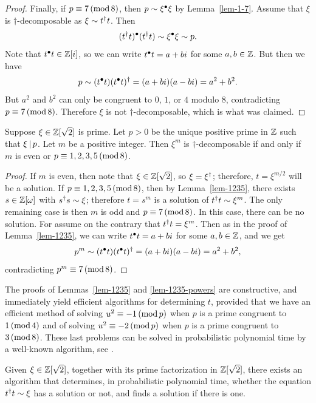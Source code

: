 \begin{proof}
  Finally, if $p\equiv 7\,(\mathop{{\rm mod}}8)$, then $p\sim\xi^{\bullet}\xi$ by
  Lemma~\ref{lem-1-7}. Assume that $\xi$ is $\dagger$-decomposable as
  $\xi\sim t^{\dagger} t$. Then
  \[ (t^{\dagger} t)^{\bullet}(t^{\dagger} t) \sim \xi^{\bullet}\xi\sim p.
  \]
  Note that $t^{\bullet} t\in\mathbb{Z}[i]$, so we can write $t^{\bullet} t=a+bi$ for some
  $a,b\in\mathbb{Z}$. But then we have
  \[ p \sim (t^{\bullet} t)(t^{\bullet} t)^{\dagger} = (a+bi)(a-bi) = a^2+b^2.
  \]
  But $a^2$ and $b^2$ can only be congruent to $0$, $1$, or $4$ modulo
  8, contradicting $p\equiv 7\,(\mathop{{\rm mod}}8)$. Therefore $\xi$ is not
  $\dagger$-decomposable, which is what was claimed.
\end{proof}

\begin{lemma}\label{lem-1235-powers}
  Suppose $\xi\in\mathbb{Z}[\sqrt2]$ is prime. Let $p>0$ be the unique
  positive prime in $\mathbb{Z}$ such that $\xi\mathop{|}\nolimits p$. Let $m$ be a
  positive integer. Then $\xi^m$ is $\dagger$-decomposable if and only
  if $m$ is even or $p\equiv 1,2,3,5\,(\mathop{{\rm mod}}8)$.
\end{lemma}

\begin{proof}
  If $m$ is even, then note that $\xi\in\mathbb{Z}[\sqrt2]$, so $\xi=\xi^{\dagger}$;
  therefore, $t=\xi^{m/2}$ will be a solution. If $p\equiv
  1,2,3,5\,(\mathop{{\rm mod}}8)$, then by Lemma~\ref{lem-1235}, there exists
  $s\in\mathbb{Z}[\omega]$ with $s^{\dagger} s\sim\xi$; therefore $t=s^m$ is a
  solution of $t^{\dagger} t\sim\xi^m$. The only remaining case is then $m$
  is odd and $p\equiv 7\,(\mathop{{\rm mod}}8)$. In this case, there can be no
  solution. For assume on the contrary that $t^{\dagger} t=\xi^m$. Then as in
  the proof of Lemma~\ref{lem-1235}, we can write $t^{\bullet} t=a+bi$ for
  some $a,b\in\mathbb{Z}$, and we get
  \[ p^m \sim (t^{\bullet} t)(t^{\bullet} t)^{\dagger} = (a+bi)(a-bi) = a^2+b^2,
  \]
  contradicting $p^m\equiv 7\,(\mathop{{\rm mod}}8)$.
\end{proof}

\begin{remark}\label{rem-1235-eff}
  The proofs of Lemmas~\ref{lem-1235} and {\ref{lem-1235-powers}} are
  constructive, and immediately yield efficient algorithms for
  determining $t$, provided that we have an efficient method of
  solving $u^2\equiv-1\,(\mathop{{\rm mod}} p)$ when $p$ is a prime congruent to
  $1\,(\mathop{{\rm mod}}4)$ and of solving $u^2\equiv-2\,(\mathop{{\rm mod}} p)$ when $p$ is a prime
  congruent to $3\,(\mathop{{\rm mod}}8)$. These last problems can be solved in
  probabilistic polynomial time by a well-known algorithm, see
  {\cite{Rabin1980}}.
\end{remark}

\begin{lemma}\label{lem-solve}
  Given $\xi\in\mathbb{Z}[\sqrt2]$, together with its prime factorization in
  $\mathbb{Z}[\sqrt2]$, there exists an algorithm that determines, in
  probabilistic polynomial time, whether the equation $t^{\dagger} t\sim\xi$ has
  a solution or not, and finds a solution if there is one.
\end{lemma}

